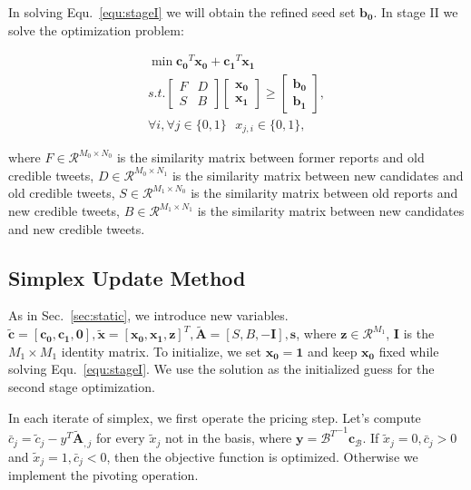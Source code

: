 \documentclass[envcountsame]{llncs}
\begin{document}
In solving Equ.~\ref{equ:stageI} we will obtain the refined seed set $\mathbf{b_0}$. In stage II we solve the optimization problem:

\vspace{-0.6cm}
\begin{eqnarray}
\min \mathbf{c_0}^T \mathbf{x_0}+\mathbf{c_1}^T\mathbf{x_1}\\\nonumber
s.t. \begin{bmatrix}
F & D \\
S & B
\end{bmatrix}\begin{bmatrix}
 \mathbf{x_0}\\
\mathbf{x_1}
\end{bmatrix}\geq \begin{bmatrix}
\mathbf{b_0}\\
\mathbf{b_1}
\end{bmatrix},\\\nonumber
 \forall i, \forall j\in \{0,1\}\textrm{ } x_{j,i}\in \{0,1\},
\end{eqnarray}
\vspace{-0.6cm}

where $F\in \mathcal{R}^{M_0\times N_0}$ is the similarity matrix between former reports and old credible tweets, $D\in \mathcal{R}^{M_0\times N_1}$ is the similarity matrix between new candidates and old credible tweets, $S\in \mathcal{R}^{M_1\times N_0}$ is the similarity matrix between old reports and new credible tweets, $B\in \mathcal{R}^{M_1 \times N_1}$ is the similarity matrix between new candidates and new credible tweets.

\subsection{Simplex Update Method}

As in Sec.~\ref{sec:static}, we introduce new variables.  $\tilde{\mathbf{c}}=[\mathbf{c_0},\mathbf{c_1}, \mathbf{0}],\tilde{\mathbf{x}}=[\mathbf{x_0},\mathbf{x_1},\mathbf{z}]^T,\tilde{\mathbf{A}}=[S,B,-\mathbf{I}],\mathbf{s}$, where $\mathbf{z}\in\mathcal{R}^{M_1}$, $ \mathbf{I}$ is the $M_1\times M_1$ identity matrix. To initialize, we set  $\mathbf{x_0}=\mathbf{1}$ and keep $\mathbf{x_0}$ fixed while solving Equ.~\ref{equ:stageI}. We use the solution as the initialized guess for the second stage optimization.

In each iterate of simplex, we first operate the pricing step.  Let's compute $\bar{c}_j = \tilde{c}_j - y^T\tilde{\mathbf{A}}_{,j}$ for every $\tilde{x}_j$ not in the basis, where $\mathbf{y} = {\mathcal{B}^T}^{-1}\mathbf{c_\mathcal{B}}$. If $\tilde{x}_j = 0, \bar{c}_j > 0$ and $\tilde{x}_j = 1,\bar{c}_j < 0$, then the objective function is optimized. Otherwise we implement the pivoting operation.
\end{document}
